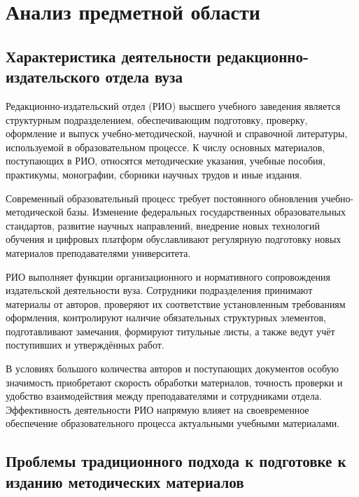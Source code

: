 \section{Анализ предметной области}

\subsection{Характеристика деятельности редакционно-издательского отдела вуза}

Редакционно-издательский отдел (РИО) высшего учебного заведения является структурным подразделением, обеспечивающим подготовку, проверку, оформление и выпуск учебно-методической, научной и справочной литературы, используемой в образовательном процессе. К числу основных материалов, поступающих в РИО, относятся методические указания, учебные пособия, практикумы, монографии, сборники научных трудов и иные издания.

Современный образовательный процесс требует постоянного обновления учебно-методической базы. Изменение федеральных государственных образовательных стандартов, развитие научных направлений, внедрение новых технологий обучения и цифровых платформ обуславливают регулярную подготовку новых материалов преподавателями университета.

РИО выполняет функции организационного и нормативного сопровождения издательской деятельности вуза. Сотрудники подразделения принимают материалы от авторов, проверяют их соответствие установленным требованиям оформления, контролируют наличие обязательных структурных элементов, подготавливают замечания, формируют титульные листы, а также ведут учёт поступивших и утверждённых работ.

В условиях большого количества авторов и поступающих документов особую значимость приобретают скорость обработки материалов, точность проверки и удобство взаимодействия между преподавателями и сотрудниками отдела. Эффективность деятельности РИО напрямую влияет на своевременное обеспечение образовательного процесса актуальными учебными материалами.

\subsection{Проблемы традиционного подхода к подготовке к изданию методических материалов}

